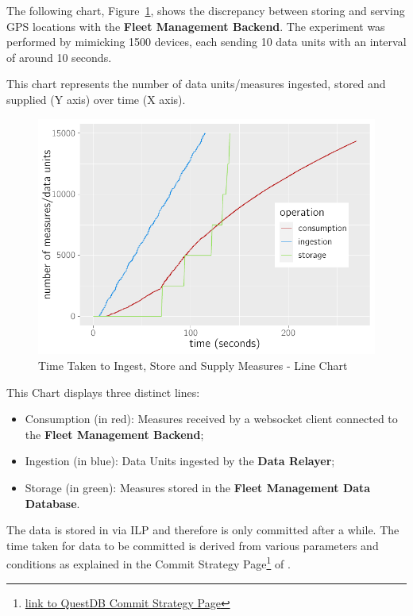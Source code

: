 The following chart, Figure~\ref{fig:evaluation:overview:servicedatabase:chart:s4}, shows the discrepancy between storing and serving GPS locations with the \textbf{Fleet Management Backend}. The experiment was performed by mimicking 1500 devices, each sending 10 data units with an interval of around 10 seconds.

This chart represents the number of data units/measures ingested, stored and supplied (Y axis) over time (X axis).

\begin{figure}[H]
    \centering
    \includegraphics[page=1]{assets/charts/s4.pdf}
    \caption[Time Taken to Ingest, Store and Supply Measures - Line Chart]{Time Taken to Ingest, Store and Supply Measures - Line Chart}
    \label{fig:evaluation:overview:servicedatabase:chart:s4}
\end{figure}

This Chart displays three distinct lines:

\begin{itemize}
    \item Consumption (in red): Measures received by a websocket client connected to the \textbf{Fleet Management Backend};
    \item Ingestion (in blue): Data Units ingested by the \textbf{Data Relayer};
    \item Storage (in green): Measures stored in the \textbf{Fleet Management Data Database}.
\end{itemize}

The data is stored in  via \gls{ILP} and therefore is only committed after a while. The time taken for data to be committed is derived from various parameters and conditions as explained in the Commit Strategy Page\footnote{\href {https://questdb.io/docs/reference/api/ilp/tcp-receiver/\#commit-strategy}{link to QuestDB Commit Strategy Page}} of .

